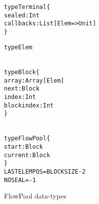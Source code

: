 \documentclass[runningheads,a4paper]{llncs}
\begin{document}
\begin{figure}[t]

\centering

\begin{minipage}[b]{4.5 cm}
\begin{alltt}
{\scriptsize
type Terminal \{
  sealed: Int
  callbacks: List[Elem => Unit]
\}

type Elem
}
\end{alltt}
\end{minipage}
\begin{minipage}[b]{3.5 cm}
\begin{alltt}
{\scriptsize
type Block \{
  array: Array[Elem]
  next: Block
  index: Int
  blockindex: Int
\}
}
\end{alltt}
\end{minipage}
\begin{minipage}[b]{4 cm}
\begin{alltt}
{\scriptsize
type FlowPool \{
  start: Block
  current: Block
\}
LASTELEMPOS = BLOCKSIZE - 2
NOSEAL = -1
}
\end{alltt}
\end{minipage}

\caption{FlowPool data-types}
\label{f-datatypes}
\end{figure}

\setlength\linenumbersep{2pt}
\end{document}
